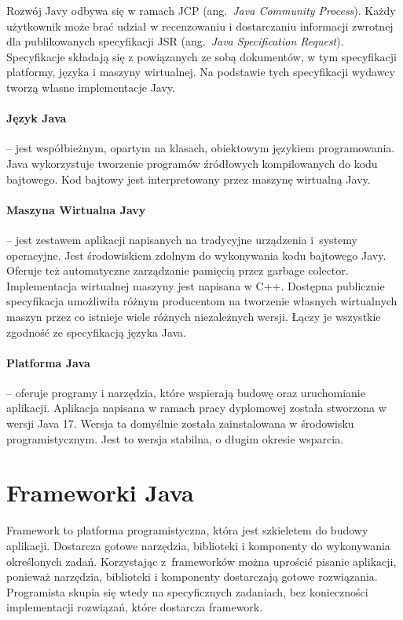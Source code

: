 Rozwój Javy odbywa się w ramach JCP (ang.~\emph{Java Community Process}). Każdy użytkownik może brać udział w recenzowaniu i dostarczaniu informacji zwrotnej dla publikowanych specyfikacji JSR (ang.~\emph{Java Specification Request}). Specyfikacje składają się z powiązanych ze sobą dokumentów, w tym specyfikacji platformy, języka i  maszyny wirtualnej. Na podstawie tych specyfikacji wydawcy tworzą własne implementacje Javy.

\paragraph{Język Java} -- jest współbieżnym, opartym na klasach, obiektowym językiem programowania. Java wykorzystuje tworzenie programów źródłowych kompilowanych do kodu bajtowego. Kod bajtowy jest interpretowany przez maszynę wirtualną Javy.

\paragraph{Maszyna Wirtualna Javy} -- jest zestawem aplikacji napisanych na tradycyjne urządzenia i~systemy operacyjne. Jest środowiskiem  zdolnym do wykonywania kodu bajtowego Javy. Oferuje też automatyczne zarządzanie pamięcią przez garbage colector. Implementacja wirtualnej maszyny jest napisana w C++. Dostępna publicznie specyfikacja umożliwiła różnym producentom na tworzenie własnych wirtualnych maszyn przez co istnieje wiele różnych niezależnych wersji. Łączy je wszystkie zgodność ze specyfikacją języka Java.

\paragraph{Platforma Java} -- oferuje programy i narzędzia, które wspierają budowę oraz uruchomianie aplikacji. Aplikacja napisana w ramach pracy dyplomowej została stworzona w wersji Java 17. Wersja ta domyślnie została zainstalowana w środowisku programistycznym. Jest to wersja stabilna, o długim okresie wsparcia.

\section{Frameworki Java}
Framework to platforma programistyczna, która jest szkieletem do budowy aplikacji. Dostarcza gotowe narzędzia, biblioteki i komponenty do wykonywania określonych zadań. Korzystając z~frameworków można uprościć pisanie aplikacji, ponieważ narzędzia, biblioteki i komponenty dostarczają gotowe rozwiązania. Programista skupia się wtedy na specyficznych zadaniach, bez konieczności implementacji rozwiązań, które dostarcza framework. 

